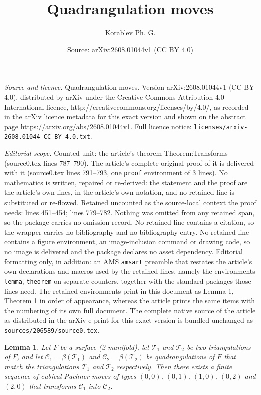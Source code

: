 \documentclass[10pt,a4paper]{amsart}
\title{Quadrangulation moves}
\author{Korablev Ph. G.}
\date{Source: arXiv:2608.01044v1 (CC BY 4.0)}
\newtheorem{lemma}{Lemma}
\begin{document}
\maketitle

\noindent\emph{Source and licence.} Quadrangulation moves. Version arXiv:2608.01044v1 (CC BY 4.0), distributed by arXiv under the Creative Commons Attribution 4.0 International licence, http://creativecommons.org/licenses/by/4.0/, as recorded in the arXiv licence metadata for this exact version and shown on the abstract page https://arxiv.org/abs/2608.01044v1. Full licence notice: \texttt{licenses/arxiv-2608.01044-CC-BY-4.0.txt}.\par\smallskip

\noindent\textit{Editorial scope.} Counted unit: the article's theorem Theorem:Transforms (source0.tex lines 787--790). The article's complete original proof of it is delivered with it (source0.tex lines 791--793, one \texttt{proof} environment of 3 lines). No mathematics is written, repaired or re-derived: the statement and the proof are the article's own lines, in the article's own notation, and no retained line is substituted or re-flowed.  Retained uncounted as the source-local context the proof needs: lines 451--454; lines 779--782.  Nothing was omitted from any retained span, so the package carries no omission record.  No retained line contains a citation, so the wrapper carries no bibliography and no bibliography entry.  No retained line contains a figure environment, an image-inclusion command or drawing code, so no image is delivered and the package declares no asset dependency.  Editorial formatting only, in addition: an AMS \texttt{amsart} preamble that restates the article's own declarations and macros used by the retained lines, namely the environments \texttt{lemma}, \texttt{theorem} on separate counters, together with the standard packages those lines need.  The retained environments print in this document as Lemma 1, Theorem 1 in order of appearance, whereas the article prints the same items with the numbering of its own full document.  The complete native source of the article as distributed in the arXiv e-print for this exact version is bundled unchanged as \texttt{sources/206589/source0.tex}.
\begin{lemma}
    \label{Lemma:MatchTransforms}
    Let $F$ be a surface (2-manifold), let $\mathcal{T}_1$ and $\mathcal{T}_2$ be two triangulations of $F$, and let $\mathcal{C}_1 = \beta(\mathcal{T}_1)$ and $\mathcal{C}_2 = \beta(\mathcal{T}_2)$ be quadrangulations of $F$ that match the triangulations $\mathcal{T}_1$ and $\mathcal{T}_2$ respectively. Then there exists a finite sequence of cubical Pachner moves of types $(0, 0)$, $(0, 1)$, $(1, 0)$, $(0, 2)$ and $(2, 0)$ that transforms $\mathcal{C}_1$ into $\mathcal{C}_2$.
\end{lemma}
\end{document}
